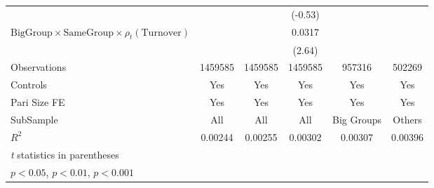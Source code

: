 {\begin{tabular}{l*{5}{c}}
                &                  &                  &  (-0.53)         &                  &                  \\
[1em]
$ {\text{BigGroup}}\times{\text{SameGroup}}\times  {\rho_t(\text{Turnover})}$ &                  &                  &   0.0317\sym{*}  &                  &                  \\
                &                  &                  &   (2.64)         &                  &                  \\
\hline
Observations    &  1459585         &  1459585         &  1459585         &   957316         &   502269         \\
Controls        &      Yes         &      Yes         &      Yes         &      Yes         &      Yes         \\
Pari Size FE    &      Yes         &      Yes         &      Yes         &      Yes         &      Yes         \\
SubSample       &      All         &      All         &      All         &Big Groups         &   Others         \\
$ R^2$          &  0.00244         &  0.00255         &  0.00302         &  0.00307         &  0.00396         \\
\hline\hline
\multicolumn{6}{l}{\footnotesize \textit{t} statistics in parentheses}\\
\multicolumn{6}{l}{\footnotesize \sym{*} \(p<0.05\), \sym{**} \(p<0.01\), \sym{***} \(p<0.001\)}\\
\end{tabular}
}
